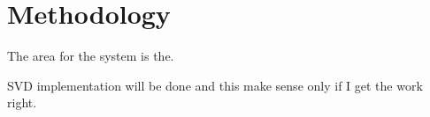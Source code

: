 \chapter{Methodology}
The area for the system is the.

SVD implementation will be done and this make sense only if I get the work right. 



